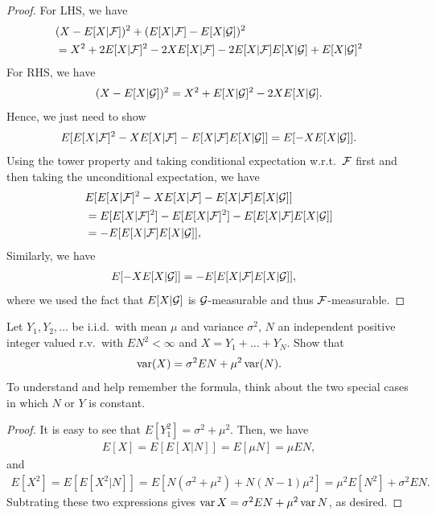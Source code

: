 \documentclass[a4paper]{article}
\begin{document}
\begin{proof}
  For LHS, we have 
  \begin{align*}
    &(X - E[X | \mathcal{F}])^2 + (E[X | \mathcal{F}] - E [X | \mathcal{G}])^2 \\
    &= X^2 + 2 E[X | \mathcal{F}]^2 - 2 X E[X | \mathcal{F}] - 2 E[X | \mathcal{F}]
    E [X | \mathcal{G}] + E[X | \mathcal{G}]^2
  \end{align*}
  For RHS, we have 
  \begin{align*}
    (X - E[X | \mathcal{G}])^2 = X^2 + E[X | \mathcal{G}]^2 - 2 X E[X | \mathcal{G}].
  \end{align*}
  Hence, we just need to show 
  \[
  E[E[X | \mathcal{F}]^2 - X E[X | \mathcal{F}] - E[X | \mathcal{F}]
    E [X | \mathcal{G}]]
  = E[- X E[X | \mathcal{G}]].
  \]
  Using the tower property and taking conditional expectation 
  w.r.t.\ $\mathcal{F}$ first and then taking the unconditional 
  expectation, we have 
  \begin{align*}
    & E[E[X | \mathcal{F}]^2 - X E[X | \mathcal{F}] - E[X | \mathcal{F}]
    E [X | \mathcal{G}]] \\
    &= E[E[X | \mathcal{F}]^2] - E[E[X | \mathcal{F}]^2]
    - E[E[X | \mathcal{F}] E[X | \mathcal{G}]]  \\
    &= - E[E[X | \mathcal{F}] E[X | \mathcal{G}]],
  \end{align*}
  Similarly, we have 
  \begin{align*}
    E[- X E[X | \mathcal{G}]]
    &= - E[E[X | \mathcal{F}] E[X | \mathcal{G}]],
  \end{align*}
  where we used the fact that $E[X | \mathcal{G}]$ is $\mathcal{G}$-measurable
  and thus $\mathcal{F}$-measurable. 

\end{proof}

\begin{ex}[Durrett 4.1.8]
  Let $Y_1, Y_2, \dots$ be i.i.d.\ with mean $\mu$ and variance 
  $\sigma^2$, $N$ an independent positive integer valued r.v.\
  with $E N^2 < \infty$ and $X = Y_1 + \dots + Y_N$. Show that 
  \[
  \operatorname{var} (X) = \sigma^2 E N + \mu^2 \operatorname{var} (N).
  \]
  To understand and 
  help remember the formula, think about the two special cases 
  in which $N$ or $Y$ is constant.
\end{ex}

\begin{proof}
  It is easy to see that $E[Y_1^2]= \sigma^2 + \mu^2$. Then, 
  we have 
  \begin{align*}
    E[X] = E[E[X | N]] = E[\mu N] = \mu EN,
  \end{align*}
  and
  \begin{align*}
    E[X^2] = E[E[X^2 | N]]
    = E[N (\sigma^2 + \mu^2) + N (N - 1) \mu^2]
    = \mu^2 E[N^2] + \sigma^2 E N.
  \end{align*}
  Subtrating these two expressions gives $\operatorname{var} X = \sigma^2 EN + \mu^2 
  \operatorname{var} N$, as desired.
\end{proof}
\end{document}
